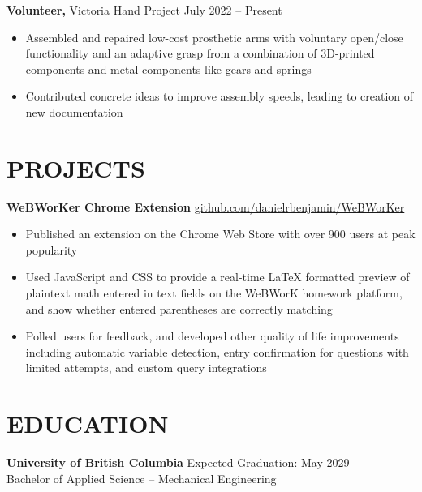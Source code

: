 \documentclass[11pt]{article}       %
\begin{document}
\textbf{Volunteer,} {Victoria Hand Project} \hfill July 2022 -- Present \\
\vspace{-8.5pt}
\begin{itemize}
  \item Assembled and repaired low-cost prosthetic arms with voluntary open/close functionality and an adaptive grasp from a combination of 3D-printed components and metal components like gears and springs
  \item Contributed concrete ideas to improve assembly speeds, leading to creation of new documentation
\end{itemize}

\vspace{-6.5pt}

\section*{PROJECTS}
\textbf{WeBWorKer Chrome Extension} \hfill \href{https://github.com/danielrbenjamin/WeBWorKer}{github.com/danielrbenjamin/WeBWorKer} \\
\vspace{-8.5pt}
\begin{itemize}
  \item Published an extension on the Chrome Web Store with over 900 users at peak popularity
  \item Used JavaScript and CSS to provide a real-time LaTeX formatted preview of plaintext math entered in text fields on the WeBWorK homework platform, and show whether entered parentheses are correctly matching
  \item Polled users for feedback, and developed other quality of life improvements including automatic variable detection, entry confirmation for questions with limited attempts, and custom query integrations
\end{itemize}

\vspace{-6.5pt}

\section*{EDUCATION}
\textbf{University of British Columbia} \hfill Expected Graduation: May 2029
\\Bachelor of Applied Science – Mechanical Engineering
\end{document}
